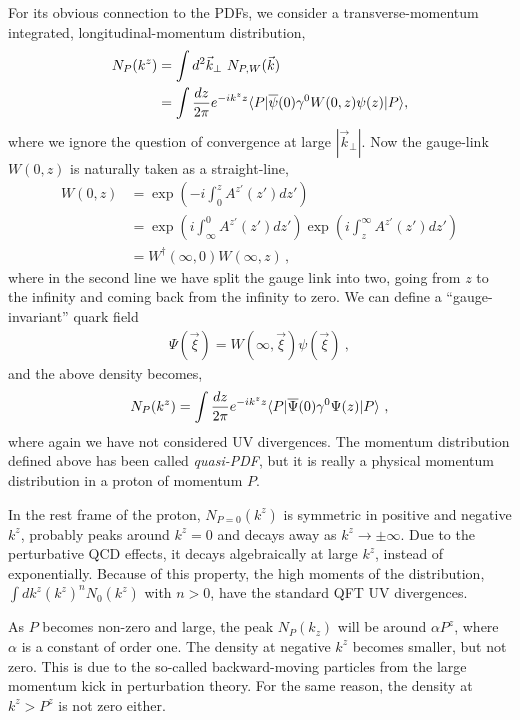For its obvious connection to the PDFs, we consider a transverse-momentum
integrated, longitudinal-momentum distribution,
\begin{align}
	N_P(k^z)&=\int  d^2\vec{k}_\perp\ N_{P,W}(\vec{k}) \nonumber \\
	&=\int {dz\over{2\pi}} e^{-ik^z z} \langle P|\overline{\psi}(0)\gamma^0 W(0,z)\psi(z)|P\rangle,
	\label{eq:momdis1}
\end{align}
where we ignore the question of convergence at large $|\vec{k}_\perp| $.
Now the gauge-link $W(0,z)$ is naturally taken as a straight-line,
\begin{align}
	W(0,z) &= \exp(-i\int^z_0 A^{z'}(z') dz') \nonumber \\
	&= \exp(i\int^0_\infty A^{z'}(z') dz')\exp(i\int^\infty_z A^{z'}(z') dz')\nonumber \\
	&= W^\dagger(\infty,0) W(\infty,z)\,,
\end{align}
where in the second line we have split the gauge link into two, going from $z$ to the infinity
and coming back from the infinity to zero. We can define a ``gauge-invariant''
quark field
\begin{align}
	\Psi(\vec{\xi}) = W(\infty,\vec{\xi})\psi(\vec{\xi}) \ ,
\end{align}
and the above density becomes,
\begin{align}
	N_P(k^z)= \int {dz\over {2\pi}} e^{-ik^z z}  \langle P|\overline{\Psi}(0)\gamma^0\Psi(z)|P\rangle \ ,
	\label{eq:momdis}
\end{align}
where again we have not considered UV divergences. The momentum
distribution defined above has been called {\it quasi-PDF}, but it is really
a physical momentum distribution in a proton of momentum $P$.

In the rest frame of the proton, $N_{{P=0}}(k^z)$ is symmetric in positive and negative $ k^z$,
probably peaks around $k^z=0$ and decays away as $k^z\to \pm\infty$.
Due to the perturbative QCD effects, it decays algebraically at large $k^z$, instead of exponentially.
Because of this property, the high moments of the distribution, $\int dk^z (k^z)^n N_0(k^z)$ with $n>0$,
have the standard QFT UV divergences.

As $P$ becomes non-zero and large, the peak $N_P(k_z)$ will be around $\alpha P^z$,
where $\alpha$ is a constant of order one. The density
at negative $k^z$ becomes smaller, but not zero. This is due to the so-called
backward-moving particles from the
large momentum kick in perturbation theory. For the same reason, the density at $k^z>P^z$ is not zero
either.

